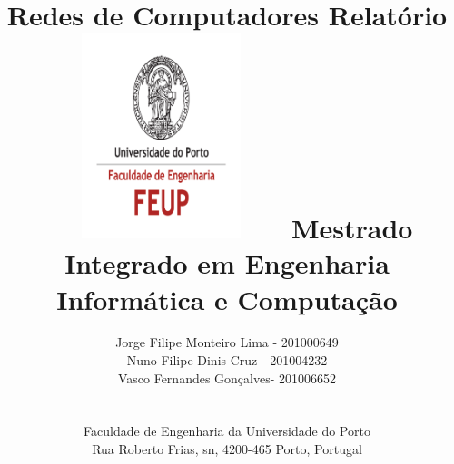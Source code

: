 \documentclass[a4paper,11pt]{article}
\begin{document}
\lstset{breaklines=true,
basicstyle=\ttfamily\small}
\setlength{\textheight}{22cm}

\title{\Huge\textbf{Redes de Computadores}\linebreak\linebreak\linebreak
\Large\textbf{Relatório}\linebreak\linebreak
\includegraphics[height=6cm, width=7cm]{feup.pdf}\linebreak \linebreak
\Large{Mestrado Integrado em Engenharia Informática e Computação} \linebreak \linebreak
}

\author{
Jorge Filipe Monteiro Lima - 201000649
\\ Nuno Filipe Dinis Cruz - 201004232 
\\ Vasco Fernandes Gonçalves- 201006652 \\\linebreak\linebreak \\
 \\ Faculdade de Engenharia da Universidade do Porto \\ Rua Roberto Frias, s\/n, 4200-465 Porto, Portugal \linebreak\linebreak\linebreak
\linebreak\linebreak\vspace{1cm}}
\maketitle
\thispagestyle{empty}

\end{document}
